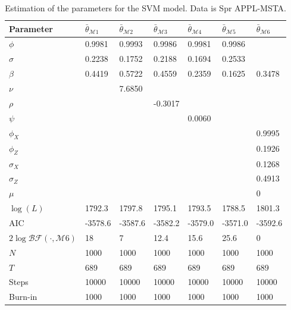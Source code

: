 \documentclass[11pt,a4,twosided,singlespacing,titlepagenumber=on]{scrreprt}
\numberwithin{equation}{chapter} %
\theoremstyle{remark}
\begin{document}
\begin{table}[htb]
\centering
\begin{tabular}{lllllll}
\label{estimation_of_svm_appl}
Parameter        & $\bar{\theta}_{\mathcal{M}1}$ & $\bar{\theta}_{\mathcal{M}2}$ & $\bar{\theta}_{\mathcal{M}3}$ & $\bar{\theta}_{\mathcal{M}4}$ & $\bar{\theta}_{\mathcal{M}5}$ & $\bar{\theta}_{\mathcal{M}6}$\\ 
\hline
$\phi$								                  & 0.9981  & 0.9993 & 0.9986  & 0.9981  & 0.9986 & \\
$\sigma$                                & 0.2238  & 0.1752 & 0.2188  & 0.1694  & 0.2533 & \\
$\beta$                                 & 0.4419  & 0.5722 & 0.4559  & 0.2359  & 0.1625 & 0.3478\\
$\nu$                                   &         & 7.6850 &         &         &         &\\
$\rho$                                  &         &        & -0.3017 &         &         & \\
$\psi$                                  &         &        &         & 0.0060  &         & \\
$\phi_X$                                &         &        &         &         &         & 0.9995\\
$\phi_Z$                                &         &        &         &         &         & 0.1926\\
$\sigma_X$                              &         &        &         &         &         & 0.1268\\
$\sigma_Z$                              &         &        &         &         &         & 0.4913\\
$\mu$                                   &         &        &         &         &         & 0 \\
$\log(L)$                               & 1792.3  & 1797.8 & 1795.1  & 1793.5  & 1788.5  & 1801.3\\
AIC                                     & -3578.6 & -3587.6& -3582.2 & -3579.0 & -3571.0 & -3592.6\\
$2 \log \mathcal{BF}(\cdot, \mathcal{M}6)$& 18    & 7      & 12.4    & 15.6    & 25.6    & 0\\
$N$                                     & 1000    & 1000   & 1000    & 1000    & 1000    & 1000\\
$T$                                     & 689     & 689    & 689     & 689     & 689     & 689\\
Steps                                   & 10000   & 10000  & 10000   & 10000   & 10000   & 10000\\
Burn-in                                 & 1000    & 1000   & 1000    & 1000    & 1000    & 1000\\
\hline
\end{tabular}
\caption{Estimation of the parameters for the SVM model. Data is Spr APPL-MSTA.}
\end{table}
\end{document}
